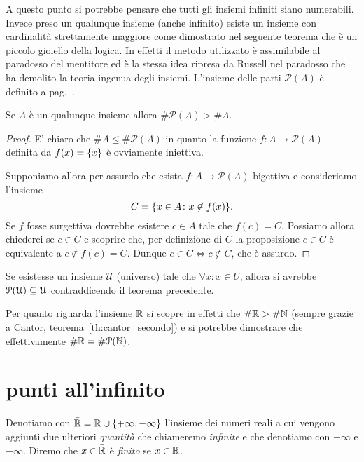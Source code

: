 A questo punto si potrebbe pensare che
tutti gli insiemi infiniti siano numerabili.
Invece preso un qualunque insieme (anche infinito)
esiste un insieme con cardinalità strettamente maggiore
come dimostrato nel seguente teorema che è un piccolo gioiello della logica.
In effetti il metodo utilizzato è assimilabile al paradosso del mentitore 
ed è la stessa idea ripresa da Russell nel paradosso che ha demolito la teoria 
ingenua degli insiemi.
L'insieme delle parti $\mathcal P(A)$ è definito a pag.~\pageref{def:insieme_parti}.
%
\begin{theorem}[Cantor]%
\label{th:Cantor}%
  Se $A$ è un qualunque insieme allora $\# \mathcal P(A) > \# A$.
\end{theorem}
%
\begin{proof}
  E' chiaro che $\# A \le \#\mathcal P(A)$ in quanto 
  la funzione $f\colon A \to \mathcal P(A)$ definita da $f(x)=\ENCLOSE{x}$
  è ovviamente iniettiva.

  Supponiamo allora per assurdo che esista $f\colon A\to \mathcal P(A)$
  bigettiva e consideriamo l'insieme 
  \[
    C = \ENCLOSE{x\in A \colon x\not\in f(x)}.  
  \]
  Se $f$ fosse surgettiva dovrebbe esistere $c\in A$ tale che $f(c) = C$.
  Possiamo allora chiederci se $c\in C$ e scoprire che, 
  per definizione di $C$ la proposizione $c\in C$ è equivalente 
  a $c\not\in f(c) = C$. 
  Dunque $c\in C \iff c\not\in C$, che è assurdo.
\end{proof}
%
\begin{corollary}
  Se esistesse un insieme $\mathcal U$ (universo) 
  tale che $\forall x\colon x \in U$, allora 
  si avrebbe $\mathcal \P(\mathcal U) \subset \mathcal U$
  contraddicendo il teorema precedente.
\end{corollary}
%
Per quanto riguarda l'insieme $\RR$ si
scopre in effetti che $\#\RR > \#\NN$
(sempre grazie a Cantor, teorema~\ref{th:cantor_secondo})
e si potrebbe dimostrare che effettivamente $\#\RR = \#\mathcal P(\NN)$.

\section{punti all'infinito}
\label{sec:reali_estesi}

\begin{definition}
\mymargin{$\bar{\RR}$}
Denotiamo con $\bar \RR=\RR \cup \ENCLOSE{+\infty, -\infty}$ l'insieme dei numeri reali
\mymargin{$+\infty$, $-\infty$}
a cui vengono aggiunti due ulteriori \emph{quantità} che chiameremo
\emph{infinite} e che denotiamo con $+\infty$ e $-\infty$.
Diremo che $x\in \bar \RR$ è \emph{finito} se $x\in \RR$.
\end{definition}



